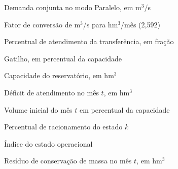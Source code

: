 \begin{simbolos}
    \item[$Q^{c}$] Demanda conjunta no modo Paralelo, em m$^3$/s
    \item[$K$] Fator de conversão de m$^3$/s para hm$^3$/mês (2,592)
    \item[$\eta$] Percentual de atendimento da transferência, em fração
    \item[$g$] Gatilho, em percentual da capacidade
    \item[$V_{\max}$] Capacidade do reservatório, em hm$^3$
    \item[$\Delta_t$] Déficit de atendimento no mês $t$, em hm$^3$
    \item[$p_t$] Volume inicial do mês $t$ em percentual da capacidade
    \item[$r_k$] Percentual de racionamento do estado $k$
    \item[$k$] Índice do estado operacional
    \item[$\varepsilon_t$] Resíduo de conservação de massa no mês $t$, em hm$^3$
\end{simbolos}
